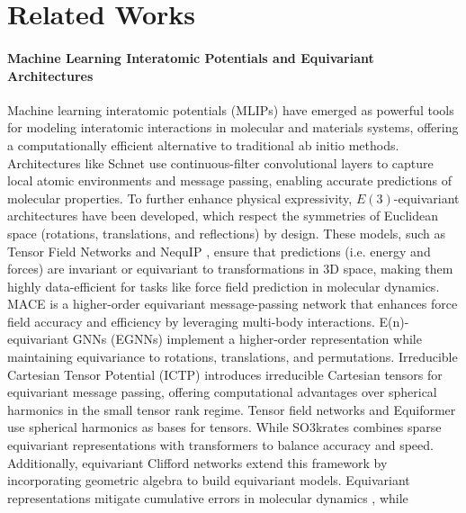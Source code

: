 \section{Related Works}
\paragraph{Machine Learning Interatomic Potentials and Equivariant Architectures} 
Machine learning interatomic potentials (MLIPs) 
have emerged as powerful tools for modeling interatomic interactions in molecular and materials systems, offering a computationally efficient alternative to traditional ab initio methods. Architectures like Schnet \cite{schutt2017schnet} use continuous-filter convolutional layers to capture local atomic environments and message passing, enabling accurate predictions of molecular properties. To further enhance physical expressivity, $E(3)$-equivariant architectures \cite{thomas2018tensor} have been developed, which respect the symmetries of Euclidean space (rotations, translations, and reflections) by design. These models, such as Tensor Field Networks \cite{thomas2018tensor} and NequIP \cite{batzner2022nequip}, ensure that predictions (i.e. energy and forces) are invariant or equivariant to transformations in 3D space, making them highly data-efficient for tasks like force field prediction in molecular dynamics. 
MACE \cite{Batatia_Kovács_Simm_Ortner_Csányi_2023} is a higher-order equivariant message-passing network that enhances force field accuracy and efficiency by leveraging multi-body interactions. 
E(n)-equivariant GNNs (EGNNs) \cite{Satorras_Hoogeboom_Welling_2022} implement a higher-order representation while maintaining equivariance to rotations, translations, and permutations. 
Irreducible Cartesian Tensor Potential (ICTP)  \cite{Zaverkin_Alesiani_Maruyama_Errica_Christiansen_Takamoto_Weber_Niepert_2024} introduces irreducible Cartesian tensors for equivariant message passing, offering computational advantages over spherical harmonics in the small tensor rank regime. Tensor field networks \cite{Thomas_Smidt_Kearnes_Yang_Li_Kohlhoff_Riley_2018} and Equiformer \cite{Liao_Smidt_2023} use spherical harmonics as bases for tensors. While SO3krates \cite{Frank_Unke_Müller_Chmiela_2024a} combines sparse equivariant representations with transformers to balance accuracy and speed.
Additionally, equivariant Clifford networks \cite{ruheCliffordGroupEquivariant2023b}
extend this framework by incorporating geometric algebra to build equivariant models. 
Equivariant representations mitigate cumulative errors in molecular dynamics  \cite{Unke_Chmiela_Sauceda_Gastegger_Poltavsky_Schütt_Tkatchenko_Müller_2021},  while 
